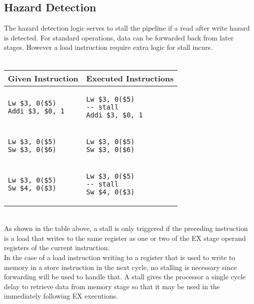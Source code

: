 \documentclass[12pt]{IEEEtran} %
\begin{document}
\subsection{Hazard Detection} %
\label{sub:hazard_detection}
The hazard detection logic serves to stall the pipeline if a read after write hazard is detected. For standard operations, data can be forwarded back from later stages. However a load instruction require extra logic for stall incurs.\\
\\
\begin{tabular}{l l}
    Given Instruction & Executed Instructions\\
    \hline 
    \begin{lstlisting}
Lw $3, 0($5)
Addi $3, $0, 1
    \end{lstlisting} & 
    \begin{lstlisting}
Lw $3, 0($5)
-- stall
Addi $3, $0, 1
    \end{lstlisting} \\
    \hline
    \begin{lstlisting}
Lw $3, 0($5)
Sw $3, 0($6)
    \end{lstlisting} &
    \begin{lstlisting}
Lw $3, 0($5)
Sw $3, 0($6)
    \end{lstlisting}\\
    \hline 
    \begin{lstlisting}
Lw $3, 0($5)
Sw $4, 0($3)
    \end{lstlisting} &
    \begin{lstlisting}
Lw $3, 0($5)
-- stall
Sw $4, 0($3)
    \end{lstlisting} \\
\end{tabular}
\vspace{0.3 cm}\\
As shown in the table above, a stall is only triggered if the preceding instruction is a load that writes to the same register as one or two of the EX stage operand registers of the current instruction. \\
In the case of a load instruction writing to a register that is used to write to memory in a store instruction in the next cycle, no stalling is necessary since forwarding will be used to handle that. A stall gives the processor a single cycle delay to retrieve data from memory stage so that it may be used in the immediately following EX executions.
\end{document}
